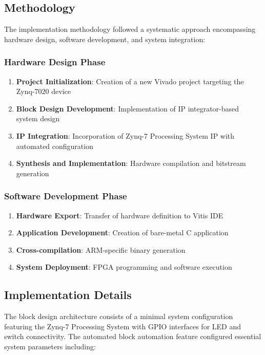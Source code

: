 \documentclass[11pt,a4paper]{article}
\begin{document}
\subsection{Methodology}
The implementation methodology followed a systematic approach encompassing hardware design, software development, and system integration:

\subsubsection{Hardware Design Phase}
\begin{enumerate}[leftmargin=*]
    \item \textbf{Project Initialization}: Creation of a new Vivado project targeting the Zynq-7020 device
    \item \textbf{Block Design Development}: Implementation of IP integrator-based system design
    \item \textbf{IP Integration}: Incorporation of Zynq-7 Processing System IP with automated configuration
    \item \textbf{Synthesis and Implementation}: Hardware compilation and bitstream generation
\end{enumerate}

\subsubsection{Software Development Phase}
\begin{enumerate}[leftmargin=*]
    \item \textbf{Hardware Export}: Transfer of hardware definition to Vitis IDE
    \item \textbf{Application Development}: Creation of bare-metal C application
    \item \textbf{Cross-compilation}: ARM-specific binary generation
    \item \textbf{System Deployment}: FPGA programming and software execution
\end{enumerate}

\subsection{Implementation Details}

The block design architecture consists of a minimal system configuration featuring the Zynq-7 Processing System with GPIO interfaces for LED and switch connectivity. The automated block automation feature configured essential system parameters including:
\end{document}
